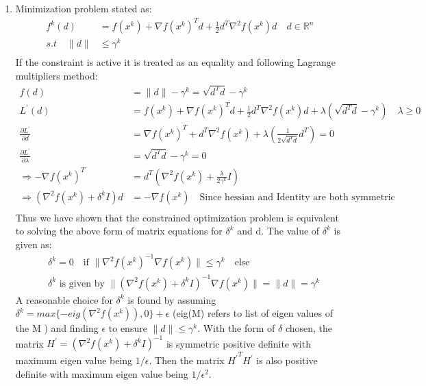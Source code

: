 \begin{enumerate}
  \item Minimization problem stated as:
  \begin{align*}
   f^k(d) &= f(x^k) + \nabla f(x^k)^T d + \frac{1}{2} d^T \nabla^2 f(x^k) d \quad
 d \in \mathbb{R}^n\\
   s.t \quad \|d\| &\leq \gamma ^{k}\\
  \end{align*}
  If the constraint is active it is treated as an equality and following Lagrange
 multipliers method:
  \begin{align*}
   f(d) &= \|d\| -\gamma^k = \sqrt{d^T d} - \gamma^k \\
   L^\prime(d) &= f(x^k) + \nabla f(x^k)^T d + \frac{1}{2} d^T \nabla^2 f(x^k) d
 + \lambda(\sqrt{d^T d} - \gamma^k) \quad \lambda \geq 0\\
   \frac{\partial L^\prime}{\partial d} &= \nabla f(x^k)^T + d^T \nabla^2 f(x^k)
 + \lambda(\frac{1}{2 \sqrt{d^T d}}d^T) = 0\\
   \frac{\partial L^\prime}{\partial \lambda} &= \sqrt{d^T d} - \gamma^k = 0 \\ 
   \Rightarrow -\nabla f(x^k)^T&= d^T \left( \nabla^2 f(x^k) + \frac{\lambda}{
 2\gamma^k }I\right) \\
   \Rightarrow \left( \nabla^2 f(x^k) + \delta^k I\right)d &= -\nabla f(x^k)\quad
 \text{Since hessian and Identity are both symmetric}\\
  \end{align*}
  Thus we have shown that the constrained optimization problem is equivalent to
 solving the above form of matrix equations for $\delta^k$ and d. The value of $\delta^k$ is given as:
\begin{align*}
	&\delta^k = 0 \quad \mbox{if } \| {\nabla^2 f(x^k)}^{-1} \nabla f(x^k) \| \leq \gamma^k \quad \mbox{else}\\
	&\delta^k \mbox{ is given by } \| \left(\nabla^2 f(x^k) + \delta^k I\right)^{-1} \nabla f(x^k) \| = \|d\| = \gamma^k
\end{align*}
A reasonable choice for $\delta^k$ is found by assuming $\delta^k =max\{-eig(\nabla^2 f(x^k)),0\}+ \epsilon $ (eig(M) refers to list of eigen values of the M	) and finding $\epsilon$ to ensure $\|d\| \leq \gamma^k$. With the form of $\delta$ chosen, the matrix $H^\prime = \left({\nabla^2 f(x^k)} + \delta^k I \right)^{-1}$ is symmetric positive definite with maximum eigen value being $1/\epsilon$. Then the  matrix ${H^\prime}^T H^\prime$ is also positive definite with maximum eigen value being $1/\epsilon^2$.

\end{enumerate}
